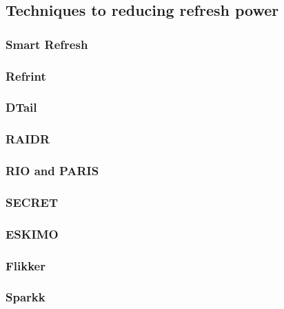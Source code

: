 \subsection{Techniques to reducing refresh power}
\label{sec:red:tech}


\subsubsection*{\textbf{Smart Refresh}}
\label{par:smartrefresh}


\subsubsection*{\textbf{Refrint}}
\label{par:refrint}


\subsubsection*{\textbf{DTail}}
\label{par:dtail}


\subsubsection*{\textbf{RAIDR}}
\label{par:raidr}


\subsubsection*{\textbf{RIO and PARIS}}
\label{par:rioparis}


\subsubsection*{\textbf{SECRET}}
\label{par:secret}


\subsubsection*{\textbf{ESKIMO}}
\label{par:eskimo}


\subsubsection*{\textbf{Flikker}}
\label{par:flikker}


\subsubsection*{\textbf{Sparkk}}
\label{par:sparkk}


